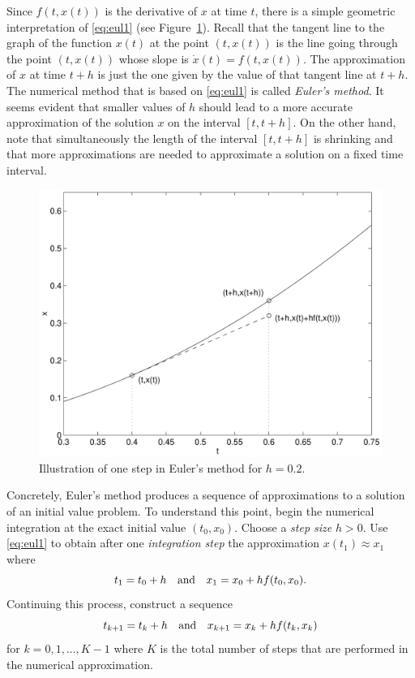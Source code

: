 \documentclass{ximera}
\begin{document}
Since $f(t,x(t))$ is the derivative of $x$ at time $t$,
there is a simple geometric interpretation of \eqref{eq:eul1}
(see Figure~\ref{fig:eul1ill}).  Recall that the tangent line to the 
graph of the function $x(t)$ at the point $(t,x(t))$ is the line 
going through the point $(t,x(t))$ whose slope is $\dot{x}(t)=f(t,x(t))$.  
The approximation of $x$ at time $t+h$ is just the one given by the value 
of that tangent line at $t+h$.  The numerical method that is based on 
\eqref{eq:eul1} is called {\em Euler's method}.
It seems evident that smaller values of $h$ should lead to a more 
accurate approximation of the solution $x$ on the interval
$[t,t+h]$.  On the other hand, note that simultaneously the 
length of the interval $[t,t+h]$ is shrinking and that more
approximations are needed to approximate a solution on a
fixed time interval.
\begin{figure}[htb]
   \centerline{%
   \includegraphics[width=4.6in]{../figures/eul1.pdf}}
   \caption{Illustration of one step in Euler's method
   for $h=0.2$.}
   \label{fig:eul1ill}
\end{figure}

Concretely, Euler's method produces a sequence of approximations
to a solution of an initial value problem.  To understand this point, 
begin the numerical integration at the exact initial value $(t_0,x_0)$.  
Choose a {\em step size\/} 
$h>0$.  Use \eqref{eq:eul1} to obtain after 
one {\em integration step\/} 
the approximation $x(t_1)\approx x_1$ where
\[
t_1 = t_0+h \quad\mbox{and}\quad x_1 = x_0 + h f(t_0, x_0).
\]
Continuing this process, construct a sequence
\begin{equation}  \label{eq:eulmethod}
t_{k+1} = t_k+h \quad\mbox{and}\quad x_{k+1} = x_k + h f(t_k, x_k)
\end{equation}
for $k=0,1,\ldots,K-1$ where $K$ is the total number of 
steps that are performed in the numerical approximation.
\end{document}
